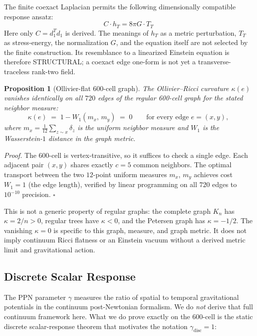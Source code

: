 \documentclass[12pt,a4paper]{article}
\newtheorem{proposition}{Proposition}
\theoremstyle{definition}
\begin{document}
The finite coexact Laplacian permits the following dimensionally compatible response ansatz:
\begin{equation}
\boxed{C \cdot h_T = 8\pi G \cdot T_T}
\label{eq:gravity}
\end{equation}
Here only $C=d_1^Td_1$ is derived.  The meanings of $h_T$ as a metric perturbation, $T_T$ as stress-energy, the normalization $G$, and the equation itself are not selected by the finite construction.  Its resemblance to a linearized Einstein equation is therefore STRUCTURAL; a coexact edge one-form is not yet a transverse-traceless rank-two field.

\begin{proposition}[Ollivier-flat 600-cell graph]
\label{prop:ricci_flat}
The Ollivier--Ricci curvature $\kappa(e)$ vanishes identically on all\/ $720$ edges of the regular 600-cell graph for the stated neighbor measure:
\begin{equation}
\kappa(e) \;=\; 1 - W_1(m_x,\, m_y) \;=\; 0 \qquad \text{for every edge } e = (x,y),
\label{eq:ollivier_flat}
\end{equation}
where $m_x = \frac{1}{12}\sum_{z \sim x}\delta_z$ is the uniform neighbor measure and\/ $W_1$ is the Wasserstein-$1$ distance in the graph metric.
\end{proposition}

\noindent\textit{Proof.}  The 600-cell is vertex-transitive, so it suffices to check a single edge.  Each adjacent pair $(x,y)$ shares exactly $c = 5$ common neighbors.  The optimal transport between the two $12$-point uniform measures $m_x$, $m_y$ achieves cost $W_1 = 1$ (the edge length), verified by linear programming on all $720$ edges to $10^{-10}$ precision.  \hfill$\square$

This is not a generic property of regular graphs: the complete graph $K_n$ has $\kappa = 2/n > 0$, regular trees have $\kappa < 0$, and the Petersen graph has $\kappa = -1/2$.  The vanishing $\kappa=0$ is specific to this graph, measure, and graph metric.  It does not imply continuum Ricci flatness or an Einstein vacuum without a derived metric limit and gravitational action.

\subsection{Discrete Scalar Response}

The PPN parameter $\gamma$ measures the ratio of spatial to temporal
gravitational potentials in the continuum post-Newtonian formalism.  We do
\emph{not} derive that full continuum framework here.  What we do prove exactly
on the 600-cell is the static discrete scalar-response theorem that motivates
the notation $\gamma_{\mathrm{disc}} = 1$:
\end{document}

